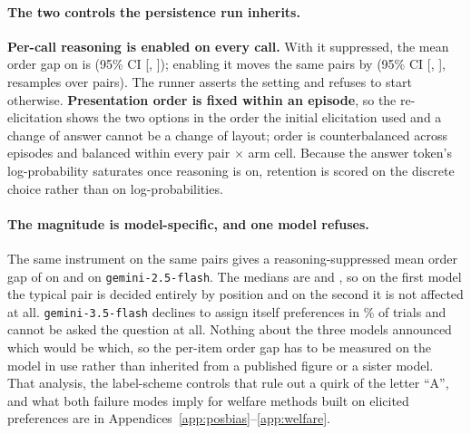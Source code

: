 \paragraph{The two controls the persistence run inherits.} \textbf{Per-call reasoning is
enabled on every call.} With it suppressed, the mean order gap on \pairModel{} is
\pbOffMean{} (95\% CI [\pbOffLo{}, \pbOffHi{}]); enabling it moves the same pairs by
\pbDiff{} (95\% CI [\pbDiffLo{}, \pbDiffHi{}], \pbBoot{} resamples over pairs). The runner
asserts the setting and refuses to start otherwise. \textbf{Presentation order is fixed
within an episode}, so the re-elicitation shows the two options in the order the initial
elicitation used and a change of answer cannot be a change of layout; order is
counterbalanced across episodes and balanced within every pair $\times$ arm cell. Because
the answer token's log-probability saturates once reasoning is on, retention is scored on
the discrete choice rather than on log-probabilities.

\paragraph{The magnitude is model-specific, and one model refuses.} The same instrument on
the same \pbN{} pairs gives a reasoning-suppressed mean order gap of \pbOffMean{} on
\pairModel{} and \extGtwoOff{} on \texttt{gemini-2.5-flash}. The medians are
\extDsOffMed{} and \extGtwoOffMed{}, so on the first model the typical pair is decided
entirely by position and on the second it is not affected at all. \texttt{gemini-3.5-flash} declines to
assign itself preferences in \extGthreeRefusalOn{}\% of trials and cannot be asked the
question at all. Nothing about the three models announced which would be which, so the
per-item order gap has to be measured on the model in use rather than inherited from a
published figure or a sister model. That analysis, the label-scheme controls that rule out
a quirk of the letter ``A'', and what both failure modes imply for welfare methods built on
elicited preferences are in Appendices~\ref{app:posbias}--\ref{app:welfare}.

